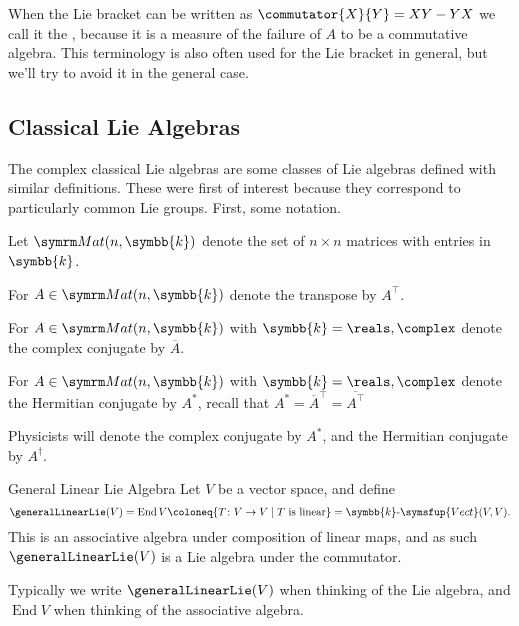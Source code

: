 \documentclass[fleqn]{NotesClass}
\makeatletter
\renewcommand{\field}{\symbb{k}}
\newcommand{\c@egory}[1]{\symsfup{#1}}
\newcommand{\Vect}[1][\field]{#1\text{-}\c@egory{Vect}}
\newcommand{\trans}{{\top}}
\newcommand{\hermit}{*}
\DeclareMathOperator{\End}{End}
\makeatother
\begin{document}
    When the Lie bracket can be written as \(\commutator{X}{Y} = XY - YX\) we call it the , because it is a measure of the failure of \(A\) to be a commutative algebra.
    This terminology is also often used for the Lie bracket in general, but we'll try to avoid it in the general case.
    
    \subsection{Classical Lie Algebras}
    The complex classical Lie algebras are some classes of Lie algebras defined with similar definitions.
    These were first of interest because they correspond to particularly common Lie groups.
    First, some notation.
    
    \begin{ntn}{}{}
        Let \(\matrices{n}{\field}\) denote the set of \(n \times n\) matrices with entries in \(\field\).
        
        For \(A \in \matrices{n}{\field}\) denote the transpose by \(A^{\trans}\).
        
        For \(A \in \matrices{n}{\field}\) with \(\field = \reals, \complex\) denote the complex conjugate by \(\overbar{A}\).
        
        For \(A \in \matrices{n}{\field}\) with \(\field = \reals, \complex\) denote the Hermitian conjugate by \(A^{\hermit}\), recall that \(A^{\hermit} = \overbar{A}^{\trans} = \overline{A^{\trans}}\)
        
        \begin{wrn}
            Physicists will denote the complex conjugate by \(A^*\), and the Hermitian conjugate by \(A^{\dagger}\).
        \end{wrn}
    \end{ntn}
    
    \begin{dfn}{General Linear Lie Algebra}{}
        Let \(V\) be a vector space, and define
        \begin{equation}
            \generalLinearLie(V) = \End V \coloneq \{T \colon V \to V \mid T \text{ is linear}\} = \Vect(V, V).
        \end{equation}
        This is an associative algebra under composition of linear maps, and as such \(\generalLinearLie(V)\) is a Lie algebra under the commutator.
    \end{dfn}
    
    Typically we write \(\generalLinearLie(V)\) when thinking of the Lie algebra, and \(\End V\) when thinking of the associative algebra.
    
\end{document}
